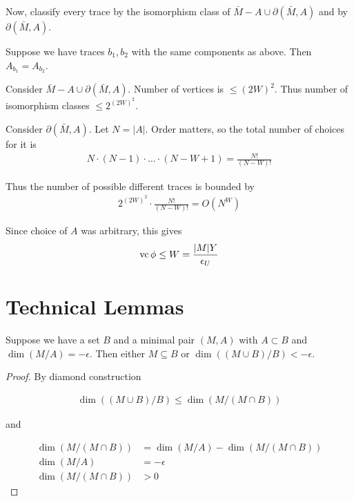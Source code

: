 \documentclass{amsart}
\begin{document}
Now, classify every trace by the isomorphism class of $\bar M - A \cup \partial(\bar M, A)$ and by $\partial(\bar M, A)$.
\begin{Lemma}
	Suppose we have traces $b_1, b_2$ with the same components as above.
	Then $A_{b_1} = A_{b_2}$.
\end{Lemma}

Consider $\bar M - A \cup \partial(\bar M, A)$.
Number of vertices is $\leq (2W)^2$.
Thus number of isomorphism classes $\leq 2^{(2W)^2}$.

Consider $\partial(\bar M, A)$.
Let $N = |A|$.
Order matters, so the total number of choices for it is
\begin{align*}
	N \cdot (N-1) \cdot \ldots \cdot (N - W + 1) = \frac{N!}{(N-W)!}
\end{align*}

Thus the number of possible different traces is bounded by 
\begin{align*}
	2^{(2W)^2} \cdot \frac{N!}{(N-W)!} = O(N^W)
\end{align*}

Since choice of $A$ was arbitrary, this gives
\begin{align*}
	\operatorname{vc}{\phi} \leq W = \frac{|M|Y}{\epsilon_U}
\end{align*}

\section{Technical Lemmas}

\begin{Lemma}
	Suppose we have a set $B$ and a minimal pair $(M, A)$ with $A \subset B$ and $\dim(M/A) = -\epsilon$.
Then either $M \subseteq B$ or $\dim((M \cup B)/B) < -\epsilon$.
\end{Lemma}

\begin{proof}
	By diamond construction

	\begin{align*}
		\dim((M \cup B)/B) \leq \dim(M / (M \cap B))
	\end{align*}

	and 

	\begin{align*}
		\dim(M / (M \cap B)) &= \dim (M/A) - \dim(M / (M \cap B)) \\
		\dim (M/A) &= -\epsilon \\
		\dim(M / (M \cap B)) &> 0
	\end{align*}
\end{proof}
\end{document}
